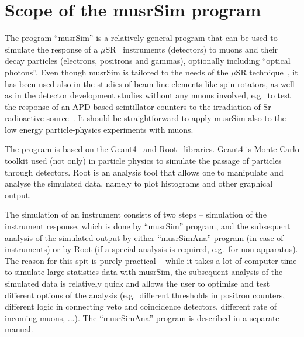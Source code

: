 \documentclass[twoside]{dis04}
\begin{document}
\section{Scope of the musrSim program}
The program ``musrSim'' is a relatively general program that can be used to simulate 
the response of a $\mu$SR~\cite{Blundel:1999} instruments (detectors) to muons and their decay particles 
(electrons, positrons and gammas), optionally including ``optical photons''.
Even though musrSim is tailored to the needs of 
the $\mu$SR technique~\cite{shirokaGeant}, it has been used also 
in the studies of beam-line elements like spin rotators, as well as
in the detector development
studies without any muons involved, e.g.\ to test the response of an APD-based 
scintillator counters to the irradiation of Sr radioactive source~\cite{FirstExperience}.
It should be straightforward to apply musrSim also to the low energy particle-physics
experiments with muons.

The program is based on the Geant4~\cite{geant} and Root~\cite{root} libraries.
Geant4 is Monte Carlo toolkit used (not only) in particle physics to simulate
the passage of particles through detectors.
Root is an analysis tool that allows one to manipulate and analyse the simulated data, 
namely to plot histograms and other graphical output.

The simulation of an instrument consists of two steps -- simulation of the instrument
response, which is done by ``musrSim'' program, and the subsequent analysis of the
simulated output by either ``musrSimAna'' program (in case of \musr instruments) or
by Root (if a special analysis is required, e.g.\ for non-\musr apparatus).
The reason for this spit is purely
practical -- while it takes a lot of computer time to simulate large statistics data
with musrSim, the subsequent analysis of the simulated data is relatively quick
and allows the user to optimise and test different options of the analysis 
(e.g.\ different thresholds in positron counters, different logic in connecting 
veto and coincidence detectors, different rate of incoming muons, ...).
The ``musrSimAna'' program is described in a separate manual.
\end{document}
